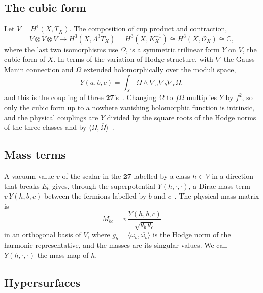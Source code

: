 \documentclass[11pt]{amsart}
\theoremstyle{definition}
\theoremstyle{remark}
\newcommand{\C}{\mathbb{C}}
\newcommand{\cO}{\mathcal{O}}
\newcommand{\ip}[2]{\langle #1,#2\rangle}
\begin{document}
\subsection{The cubic form}

Let $V=H^1(X,T_X)$. The composition of cup product and contraction,
\[
V\otimes V\otimes V\to H^3(X,\Lambda^3T_X)=H^3(X,K_X^{-1})\cong
H^3(X,\cO_X)\cong\C,
\]
where the last two isomorphisms use $\Omega$, is a symmetric trilinear form
$Y$ on $V$, the cubic form of $X$. In terms of the variation of Hodge
structure, with $\nabla$ the Gauss--Manin connection and $\Omega$ extended
holomorphically over the moduli space,
\begin{equation}\label{eq:yukawa}
Y(a,b,c)=\int_X\Omega\wedge\nabla_a\nabla_b\nabla_c\Omega,
\end{equation}
and this is the coupling of three $\mathbf{27}$'s~\cite{Str85}. Changing
$\Omega$ to $f\Omega$ multiplies $Y$ by $f^2$, so only the cubic form up to
a nowhere vanishing holomorphic function is intrinsic, and the physical
couplings are $Y$ divided by the square roots of the Hodge norms of the three
classes and by $\ip{\Omega}{\overline\Omega}$~\cite{DKL90,CdlO91}.

\subsection{Mass terms}

A vacuum value $v$ of the scalar in the $\mathbf{27}$ labelled by a class
$h\in V$ in a direction that breaks $E_6$ gives, through the superpotential
$Y(h,\cdot,\cdot)$, a Dirac mass term $v\,Y(h,b,c)$ between the fermions
labelled by $b$ and $c$~\cite{Wit85}. The physical mass matrix is
\begin{equation}\label{eq:massmatrix}
M_{bc}=v\,\frac{Y(h,b,c)}{\sqrt{g_{b}\,g_{c}}}
\end{equation}
in an orthogonal basis of $V$, where $g_b=\ip{\omega_b}{\overline{\omega_b}}$
is the Hodge norm of the harmonic representative, and the masses are its
singular values. We call $Y(h,\cdot,\cdot)$ the mass map of $h$.

\subsection{Hypersurfaces}
\end{document}
